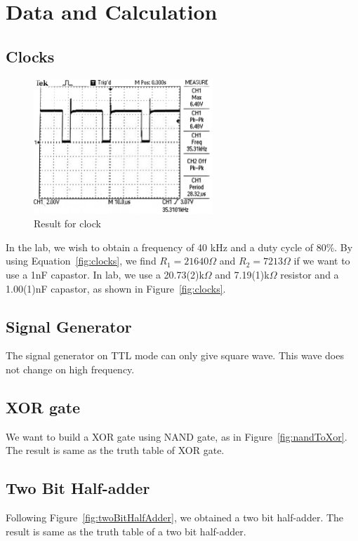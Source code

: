 \documentclass[aps,prl,reprint]{revtex4-1}
\begin{document}
\section{Data and Calculation}
    \subsection{Clocks}
        \begin{figure}[h]
            \centering
            \includegraphics[height=2in]{image/clock-lab.pdf}
            \caption{Result for clock}
            \label{fig:clockResult}
        \end{figure}
        In the lab, we wish to obtain a frequency of 40 kHz and a duty cycle of 80\%. By using Equation~\ref{fig:clocks}, we find $R_1 = 21640\Omega$ and $R_2 = 7213\Omega$ if we want to use a 1nF capastor. In lab, we use a 20.73(2)k$\Omega$ and 7.19(1)k$\Omega$ resistor and a 1.00(1)nF capastor, as shown in Figure~\ref{fig:clocks}.
    \subsection{Signal Generator}
        The signal generator on TTL mode can only give square wave. This wave does not change on high frequency.

    \subsection{XOR gate}
        We want to build a XOR gate using NAND gate, as in Figure~\ref{fig:nandToXor}. The result is same as the truth table of XOR gate.

    \subsection{Two Bit Half-adder}
        Following Figure~\ref{fig:twoBitHalfAdder}, we obtained a two bit half-adder. The result is same as the truth table of a two bit half-adder.
\end{document}
